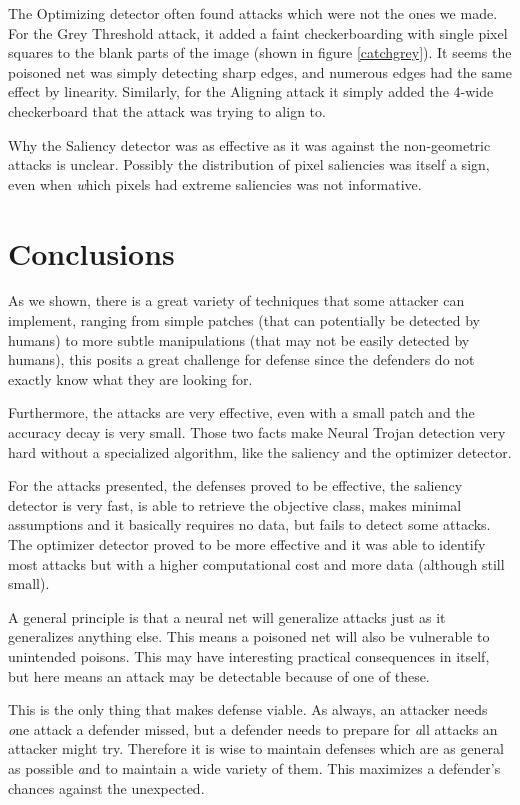 \documentclass[letterpaper, 10 pt, conference]{ieeeconf}  %
\begin{document}
The Optimizing detector often found attacks which were not the ones we
made.  For the Grey Threshold attack, it added a faint checkerboarding
with single pixel squares to the blank parts of the image (shown in
figure \ref{catchgrey}).  It seems
the poisoned net was simply detecting sharp edges, and numerous edges
had the same effect by linearity.  Similarly, for the Aligning attack
it simply added the 4-wide checkerboard that the attack was trying to
align to.

Why the Saliency detector was as effective as it was against the
non-geometric attacks is unclear.  Possibly the distribution of pixel
saliencies was itself a sign, even when {\textit which} pixels had
extreme saliencies was not informative.

\section{Conclusions}

As we shown, there is a great variety of techniques that some attacker can
implement, ranging from simple patches (that can potentially be detected by
humans) to more subtle manipulations (that may not be easily detected
by humans), this posits a great challenge for defense since the defenders do
not exactly know what they are looking for.

Furthermore, the attacks are very effective, even with a small patch and the
accuracy decay is very small. Those two facts make Neural Trojan detection
very hard without a specialized algorithm, like the saliency and the
optimizer detector.

For the attacks presented, the defenses proved to be effective, the saliency
detector is very fast, is able to retrieve the objective class, makes minimal
assumptions and it basically requires no data, but fails to detect some
attacks. The optimizer detector proved to be more effective and it
was able to identify most attacks but with a
higher computational cost and more data (although still small).

A general principle is that a neural net will generalize attacks just
as it generalizes anything else.  This means a poisoned net will also
be vulnerable to unintended poisons.  This may have interesting
practical consequences in itself, but here means an attack may be
detectable because of one of these.

This is the only thing that makes defense viable.  As always, an
attacker needs {\textit one} attack a defender missed, but a defender
needs to prepare for {\textit all} attacks an attacker might try.
Therefore it is wise to maintain defenses which are as general as
possible {\textit and} to maintain a wide variety of them.  This
maximizes a defender's chances against the unexpected.
\end{document}
